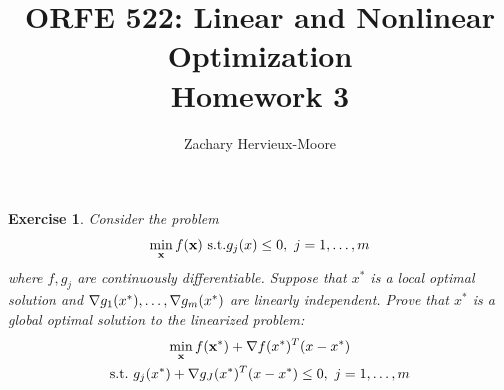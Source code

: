 \documentclass[12pt]{article}
\title{ORFE 522: Linear and Nonlinear Optimization \\ Homework 3}
\author{Zachary Hervieux-Moore}
\date{\displaydate{date}}
\theoremstyle{colon}
\newtheorem{exercise}{Exercise}
\begin{document}
\maketitle

\clearpage

\begin{exercise}
  Consider the problem
  \begin{gather*}
    \min_\textbf{x} f(\textbf{x}) \ \text{s.t.} g_j(x) \leq 0, \ j = 1, \mathellipsis, m
  \end{gather*}
  where $f,g_j$ are continuously differentiable. Suppose that $x^*$ is a local optimal solution and $\nabla g_1(x^*), \mathellipsis, \nabla g_m(x^*)$ are linearly independent. Prove that $x^*$ is a global optimal solution to the linearized problem:
  \begin{gather*}
    \min_\textbf{x} f(\textbf{x}^*) + \nabla f(x^*)^T (x-x^*) \\
    \text{s.t.} \ g_j(x^*) + \nabla g_J(x^*)^T (x-x^*) \leq 0, \ j = 1, \mathellipsis, m
  \end{gather*}
\end{exercise}
\end{document}
